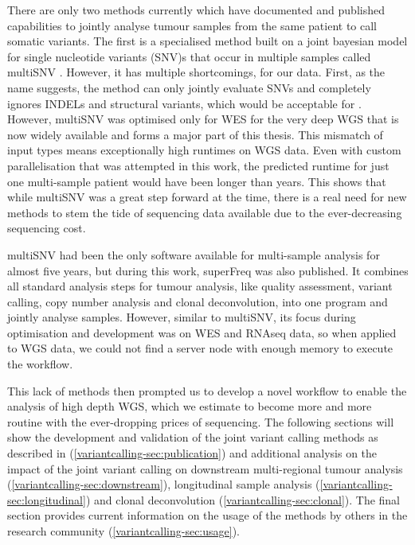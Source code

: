 There are only two methods currently which have documented and published capabilities to jointly analyse tumour samples from the same patient to call somatic variants. The first  is a specialised method built on a joint bayesian model for single nucleotide variants (SNV)s that occur in multiple samples called multiSNV \cite{Josephidou2015}. However, it has multiple shortcomings,  for our data. First, as the name suggests, the method can only jointly evaluate SNVs and completely ignores INDELs and structural variants, which would be acceptable for . However, multiSNV was optimised only for WES  for the very deep WGS that is now widely available and forms a major part of this thesis. This mismatch of input types means exceptionally high runtimes on WGS data. Even with custom parallelisation that was attempted in this work, the predicted runtime for just one multi-sample patient would have been longer than  years. This  shows that while multiSNV was a great step forward at the time, there is a real need for new methods to stem the tide of sequencing data available due to the ever-decreasing sequencing cost.

multiSNV had been the only software available for multi-sample analysis for almost five years, but during this work, superFreq \cite{Flensburg2020} was also published. It combines all standard analysis steps for tumour analysis, like quality assessment, variant calling, copy number analysis and clonal deconvolution, into one program and  jointly analyse samples. However, similar to multiSNV, its focus during optimisation and development was on WES and RNAseq data, so when applied to WGS data, we could not find a server node with enough memory to execute the workflow.

This lack of methods then prompted us to develop a novel workflow to enable the analysis of high depth WGS, which we estimate to become more and more routine with the ever-dropping prices of sequencing. The following sections will show the development and validation of the joint variant calling methods as described in \textcite{Hollizeck2021} (\autoref{variantcalling-sec:publication}) and additional analysis on the impact of the joint variant calling on downstream multi-regional tumour analysis (\autoref{variantcalling-sec:downstream}), longitudinal sample analysis (\autoref{variantcalling-sec:longitudinal}) and clonal deconvolution (\autoref{variantcalling-sec:clonal}). The final section provides current information on the usage of the methods by others in the research community (\autoref{variantcalling-sec:usage}).

